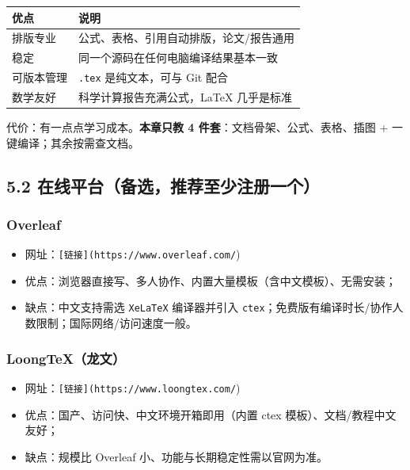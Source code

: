 {\def\LTcaptype{none} %
\begin{longtable}[]{@{}ll@{}}
\toprule\noalign{}
优点 & 说明 \\
\midrule\noalign{}
\endhead
\bottomrule\noalign{}
\endlastfoot
排版专业 & 公式、表格、引用自动排版，论文/报告通用 \\
稳定 & 同一个源码在任何电脑编译结果基本一致 \\
可版本管理 & \texttt{.tex} 是纯文本，可与 Git 配合 \\
数学友好 & 科学计算报告充满公式，LaTeX 几乎是标准 \\
\end{longtable}
}

代价：有一点点学习成本。\textbf{本章只教 4
件套}：文档骨架、公式、表格、插图 + 一键编译；其余按需查文档。

\subsection{5.2
在线平台（备选，推荐至少注册一个）}\label{ux5728ux7ebfux5e73ux53f0ux5907ux9009ux63a8ux8350ux81f3ux5c11ux6ce8ux518cux4e00ux4e2a}

\subsubsection{Overleaf}\label{overleaf}

\begin{itemize}
\tightlist
\item
  网址：\texttt{{[}链接{]}(https://www.overleaf.com/})
\item
  优点：浏览器直接写、多人协作、内置大量模板（含中文模板）、无需安装；
\item
  缺点：中文支持需选 \texttt{XeLaTeX} 编译器并引入
  \texttt{ctex}；免费版有编译时长/协作人数限制；国际网络/访问速度一般。
\end{itemize}

\subsubsection{LoongTeX（龙文）}\label{loongtexux9f99ux6587}

\begin{itemize}
\tightlist
\item
  网址：\texttt{{[}链接{]}(https://www.loongtex.com/})
\item
  优点：国产、访问快、中文环境开箱即用（内置 ctex
  模板）、文档/教程中文友好；
\item
  缺点：规模比 Overleaf 小、功能与长期稳定性需以官网为准。
\end{itemize}


